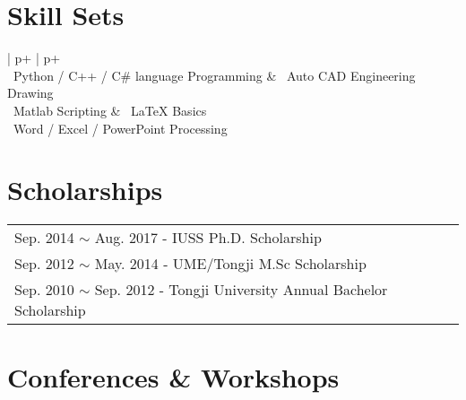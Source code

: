 \documentclass{../Template/my_cv}
\begin{document}

\section{Skill Sets}

\def\arraystretch{1.0}
\noindent\hspace{24pt}
\begin{tabular}{| p{\dimexpr \colOne+\colTwo \relax} | p{\dimexpr \colOne+\colTwo \relax}}
     \\
    

    \textbullet\ Python / C++ / C\# language Programming & \textbullet\ Auto CAD Engineering Drawing \\
    
    \textbullet\ Matlab Scripting & \textbullet\ \LaTeX \hspace{2pt} Basics\\

    \textbullet\ Word / Excel / PowerPoint Processing 
\end{tabular}

\def\arraystretch{1.0}


\section{Scholarships}
\noindent\hspace{24pt}
\begin{tabular} {| l}
    Sep. 2014 $\sim$ Aug. 2017 - IUSS Ph.D. Scholarship \\

    Sep. 2012 $\sim$ May. 2014 - UME/Tongji M.Sc Scholarship \\

    Sep. 2010 $\sim$ Sep. 2012 - Tongji University Annual Bachelor Scholarship
\end{tabular}

\section{Conferences \& Workshops}
\end{document}
